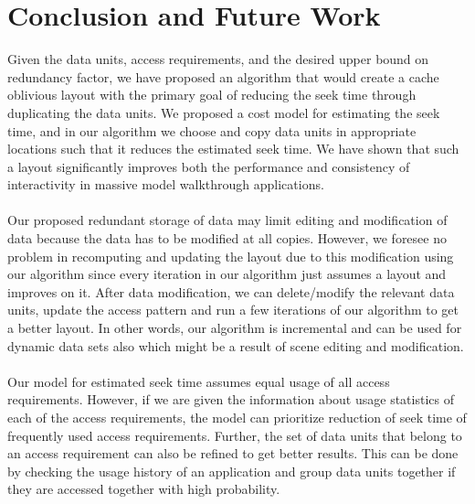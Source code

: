 
\section{Conclusion and Future Work}

Given the data units, access requirements, and the desired upper bound on redundancy factor, we have proposed an algorithm that would create a cache oblivious layout with the primary goal of reducing the seek time through duplicating the data units. We proposed a cost model for estimating the seek time, and in our algorithm we choose and copy data units in appropriate locations such that it reduces the estimated seek time.  We have shown that such a layout significantly improves both the performance and consistency of interactivity in massive model walkthrough applications.  \\
\\
Our proposed redundant storage of data may limit editing and modification of data because the data has to be modified at all copies. However, we foresee no problem in recomputing and updating the layout due to this modification using our algorithm since every iteration in our algorithm just assumes a layout and improves on it. After data modification, we can delete/modify the relevant data units, update the access pattern and run a few iterations of our algorithm to get a better layout. In other words, our algorithm is incremental and can be used for dynamic data sets also which might be a result of scene editing and modification.\\
\\
Our model for estimated seek time assumes equal usage of all access requirements. However, if we are given the information about usage statistics of each of the access requirements, the model can prioritize reduction of seek time of frequently used access requirements. Further, the set of data units that belong to an access requirement can also be refined to get better results. This can be done by checking the usage history of an application and group data units together if they are accessed together with high probability.

